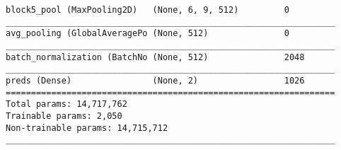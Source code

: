 \begin{verbatim}
block5_pool (MaxPooling2D)   (None, 6, 9, 512)         0         
_________________________________________________________________
avg_pooling (GlobalAveragePo (None, 512)               0         
_________________________________________________________________
batch_normalization (BatchNo (None, 512)               2048      
_________________________________________________________________
preds (Dense)                (None, 2)                 1026      
=================================================================
Total params: 14,717,762
Trainable params: 2,050
Non-trainable params: 14,715,712
_________________________________________________________________ 
\end{verbatim}

